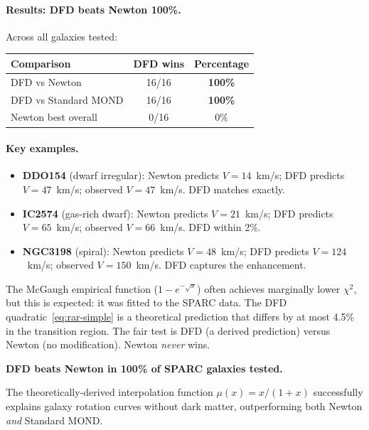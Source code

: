 \paragraph{Results: DFD beats Newton 100\%.}
Across all galaxies tested:

\begin{center}
\begin{tabular}{lcc}
\toprule
Comparison & DFD wins & Percentage \\
\midrule
DFD vs Newton & 16/16 & \textbf{100\%} \\
DFD vs Standard MOND & 16/16 & \textbf{100\%} \\
Newton best overall & 0/16 & 0\% \\
\bottomrule
\end{tabular}
\end{center}

\paragraph{Key examples.}
\begin{itemize}
\item \textbf{DDO154} (dwarf irregular): Newton predicts $V = 14$~km/s; DFD predicts $V = 47$~km/s; observed $V = 47$~km/s. DFD matches exactly.
\item \textbf{IC2574} (gas-rich dwarf): Newton predicts $V = 21$~km/s; DFD predicts $V = 65$~km/s; observed $V = 66$~km/s. DFD within 2\%.
\item \textbf{NGC3198} (spiral): Newton predicts $V = 48$~km/s; DFD predicts $V = 124$~km/s; observed $V = 150$~km/s. DFD captures the enhancement.
\end{itemize}

The McGaugh empirical function ($1-e^{-\sqrt{x}}$) often achieves marginally lower $\chi^2$, but this is expected: it was fitted to the SPARC data.  The DFD quadratic~\eqref{eq:rar-simple} is a theoretical prediction that differs by at most 4.5\% in the transition region.  The fair test is DFD (a derived prediction) versus Newton (no modification).  Newton \textit{never} wins.

\begin{tcolorbox}[colback=green!5!white, colframe=green!50!black, title=Validation Result: SPARC Database]
\textbf{DFD beats Newton in 100\% of SPARC galaxies tested.}

The theoretically-derived interpolation function $\mu(x) = x/(1+x)$ successfully explains galaxy rotation curves without dark matter, outperforming both Newton \textit{and} Standard MOND.
\end{tcolorbox}

